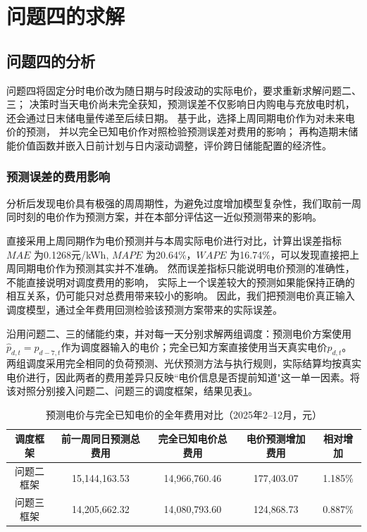 \section{问题四的求解}

\subsection{问题四的分析}
问题四将固定分时电价改为随日期与时段波动的实际电价，要求重新求解问题二、三；
决策时当天电价尚未完全获知，预测误差不仅影响日内购电与充放电时机，
还会通过日末储电量传递至后续日期。
基于此，选择上周同期电价作为对未来电价的预测，
并以完全已知电价作对照检验预测误差对费用的影响；
再构造期末储能价值函数并嵌入日前计划与日内滚动调整，评价跨日储能配置的经济性。

\subsubsection{预测误差的费用影响}
\label{sec:q4-baseline-cost}
分析后发现电价具有极强的周周期性，为避免过度增加模型复杂性，我们取前一周同时刻的电价作为预测方案，并在本部分评估这一近似预测带来的影响。

直接采用上周同期作为电价预测并与本周实际电价进行对比，计算出误差指标 $MAE$ 为0.1268元/kWh, $MAPE$ 为20.64\%，$WAPE$ 为16.74\%，可以发现直接把上周同期电价作为预测其实并不准确。
然而误差指标只能说明电价预测的准确性，不能直接说明对调度费用的影响，
实际上一个误差较大的预测如果能保持正确的相互关系，仍可能只对总费用带来较小的影响。
因此，我们把预测电价真正输入调度模型，通过全年费用回测检验该预测方案带来的实际误差。

沿用问题二、三的储能约束，并对每一天分别求解两组调度：预测电价方案使用$\widehat p_{d,t}=p_{d-7,t}$作为调度器输入的电价；完全已知方案直接使用当天真实电价$p_{d,t}$。两组调度采用完全相同的负荷预测、光伏预测方法与执行规则，实际结算均按真实电价进行，因此两者的费用差异只反映``电价信息是否提前知道"这一单一因素。将该对照分别接入问题二、问题三的调度框架，结果见表\ref{tab:q4-baseline-cost}。

\begin{table}[H]
  \centering
  \caption{预测电价与完全已知电价的全年费用对比（2025年2--12月，元）}
  \label{tab:q4-baseline-cost}
  \small
  \renewcommand{\arraystretch}{1.3}
  \begin{tabular}{|c|c|c|c|c|}
    \hline
    调度框架 & 前一周同日预测总费用 & 完全已知电价总费用 & 电价预测增加费用 & 相对增加 \\
    \hline
    问题二框架 & 15{,}144{,}163.53 & 14{,}966{,}760.46 & 177{,}403.07 & 1.185\% \\
    \hline
    问题三框架 & 14{,}205{,}662.32 & 14{,}080{,}793.60 & 124{,}868.73 & 0.887\% \\
    \hline
  \end{tabular}
\end{table}

